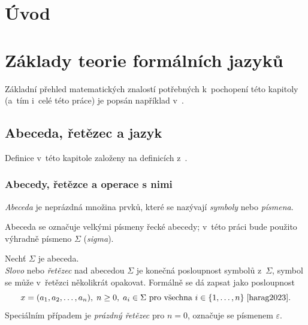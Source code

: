 
%

\listofdotazy
\listoftodos

\chapter{Úvod}\label{kap_uvod}

\chapter{Základy teorie formálních jazyků}\label{kap_teorie}
Základní přehled matematických znalostí potřebných k~pochopení této kapitoly (a~tím i~celé této práce) je popsán například v~\cite{meduna_zemek_2014}.
\section{Abeceda, řetězec a jazyk}\label{kap_abec_ret_jazyk}
Definice v~této kapitole založeny na definicích z~\cite{hopcroft2006introduction, handbook1-zaklady, TIN-opora}.

\subsection*{Abecedy, řetězce a operace s nimi}

\begin{definition}
    \emph{Abeceda} je neprázdná množina prvků, které se nazývají \emph{symboly} nebo \emph{písmena}.
\end{definition}

\begin{convention}
    Abeceda se označuje velkými písmeny řecké abecedy; v~této práci bude použito výhradně písmeno $\Sigma$ (\emph{sigma}).
\end{convention}

\begin{definition}
    Nechť $\Sigma$ je abeceda. \\
    \emph{Slovo} nebo \emph{řetězec} nad abecedou $\Sigma$ je konečná posloupnost symbolů z~$\Sigma$, symbol se může v~řetězci několikrát opakovat.
    Formálně se dá zapsat jako posloupnost
    \begin{equation*}
        x = (a_1, a_2, \ldots, a_n),\; n \geq 0,\; a_i \in \Sigma \text{ pro všechna } i \in \{1, \ldots ,n\}\; \cite{harag2023}.
    \end{equation*}
    Speciálním případem je \emph{prázdný řetězec} pro $n = 0$, označuje se písmenem $\varepsilon$.
\end{definition}

